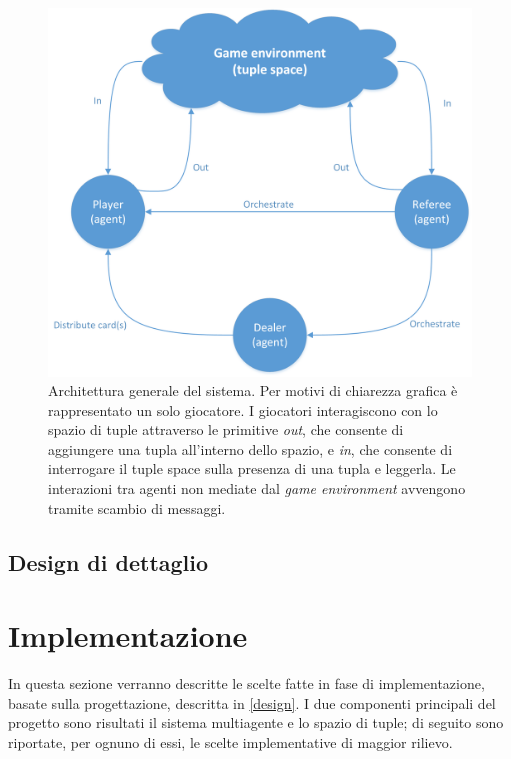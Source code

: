 \documentclass[a4paper,12pt]{article}
\begin{document}
\begin{figure}[H]
	\centering
	\includegraphics[width=\textwidth]{./img/general_architecture.png}
	\caption{Architettura generale del sistema. Per motivi di chiarezza grafica è rappresentato un solo giocatore. I giocatori interagiscono  con lo spazio di tuple attraverso le primitive \emph{out}, che consente di aggiungere una tupla all'interno dello spazio, e \emph{in}, che consente di interrogare il tuple space sulla presenza di una tupla e leggerla. Le interazioni tra agenti non mediate dal \emph{game environment} avvengono tramite scambio di messaggi.\label{general-architecture}}
\end{figure}


\subsection{Design di dettaglio} \label{design}

\section{Implementazione} \label{implementation}
In questa sezione verranno descritte le scelte fatte in fase di implementazione, basate sulla progettazione, descritta in \autoref{design}. I due componenti principali del progetto sono risultati il sistema multiagente e lo spazio di tuple; di seguito sono riportate, per ognuno di essi, le scelte implementative di maggior rilievo.  
\end{document}
